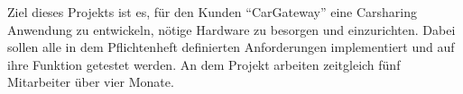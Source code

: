 Ziel dieses Projekts ist es, für den Kunden \enquote{CarGateway} eine Carsharing Anwendung zu entwickeln,
nötige Hardware zu besorgen und einzurichten.
Dabei sollen alle in dem Pflichtenheft definierten Anforderungen implementiert und auf ihre Funktion
getestet werden.
An dem Projekt arbeiten zeitgleich fünf Mitarbeiter über vier Monate.